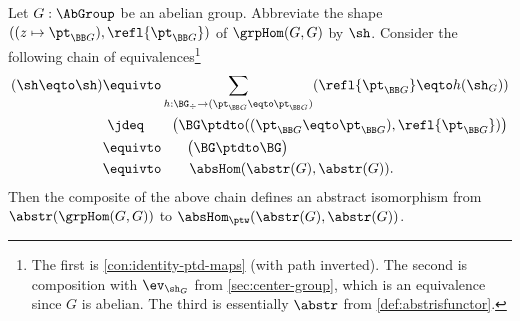 \begin{lemma}\label{lem:grpHomOK}
Let $G:\AbGroup$ be an abelian group. Abbreviate the shape
$((z\mapsto \pt_{\BB G}),\refl{\pt_{\BB G}})$ of $\grpHom(G,G)$ by $\sh$. 
Consider the following chain of equivalences\footnote{%
The first is \cref{con:identity-ptd-maps} (with path inverted). 
The second is composition with $\ev_{\sh_G}$
from \cref{sec:center-group}, which is an equivalence since $G$ is abelian.
The third is essentially $\abstr$ from \cref{def:abstrisfunctor}.}
\begin{align*}
(\sh\eqto\sh) &\equivto 
\sum_{h:\BG_\div\to(\pt_{\BB G}\eqto\pt_{\BB G})} 
  (\refl{\pt_{\BB G}}\eqto h(\sh_G)) \\
              &~\jdeq \qquad \bigl(\BG\ptdto((\pt_{\BB G}\eqto\pt_{\BB G}),\refl{\pt_{\BB G}})\bigr)\\
 &\equivto \qquad\! \bigl(\BG\ptdto\BG\bigr)\\
 &\equivto \qquad \absHom(\abstr(G),\abstr(G)).
\end{align*}
Then the composite of the above chain defines an abstract isomorphism
from $\abstr(\grpHom(G,G))$ to $\absHom_{\ptw}(\abstr(G),\abstr(G))$.
\end{lemma}
